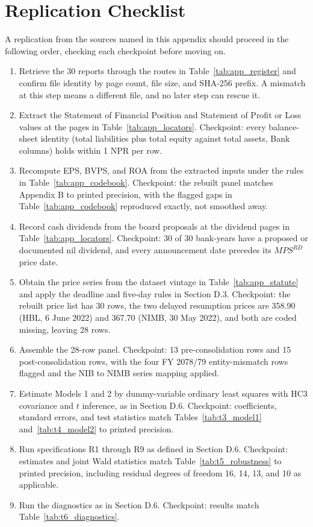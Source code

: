 \section{Replication Checklist}

A replication from the sources named in this appendix should proceed in the following order, checking each checkpoint before moving on.

\begin{enumerate}[noitemsep,topsep=2pt,partopsep=0pt,parsep=1pt]
\item Retrieve the 30 reports through the routes in Table~\ref{tab:app_register} and confirm file identity by page count, file size, and SHA-256 prefix. A mismatch at this step means a different file, and no later step can rescue it.
\item Extract the Statement of Financial Position and Statement of Profit or Loss values at the pages in Table~\ref{tab:app_locators}. Checkpoint: every balance-sheet identity (total liabilities plus total equity against total assets, Bank columns) holds within 1 NPR per row.
\item Recompute EPS, BVPS, and ROA from the extracted inputs under the rules in Table~\ref{tab:app_codebook}. Checkpoint: the rebuilt panel matches Appendix B to printed precision, with the flagged gaps in Table~\ref{tab:app_codebook} reproduced exactly, not smoothed away.
\item Record cash dividends from the board proposals at the dividend pages in Table~\ref{tab:app_locators}. Checkpoint: 30 of 30 bank-years have a proposed or documented nil dividend, and every announcement date precedes its $\mathit{MPS}^{RD}$ price date.
\item Obtain the price series from the dataset vintage in Table~\ref{tab:app_statute} and apply the deadline and five-day rules in Section D.3. Checkpoint: the rebuilt price list has 30 rows, the two delayed resumption prices are 358.90 (HBL, 6 June 2022) and 367.70 (NIMB, 30 May 2022), and both are coded missing, leaving 28 rows.
\item Assemble the 28-row panel. Checkpoint: 13 pre-consolidation rows and 15 post-consolidation rows, with the four FY 2078/79 entity-mismatch rows flagged and the NIB to NIMB series mapping applied.
\item Estimate Models 1 and 2 by dummy-variable ordinary least squares with HC3 covariance and $t$ inference, as in Section D.6. Checkpoint: coefficients, standard errors, and test statistics match Tables~\ref{tab:t3_model1} and~\ref{tab:t4_model2} to printed precision.
\item Run specifications R1 through R9 as defined in Section D.6. Checkpoint: estimates and joint Wald statistics match Table~\ref{tab:t5_robustness} to printed precision, including residual degrees of freedom 16, 14, 13, and 10 as applicable.
\item Run the diagnostics as in Section D.6. Checkpoint: results match Table~\ref{tab:t6_diagnostics}.
\end{enumerate}

